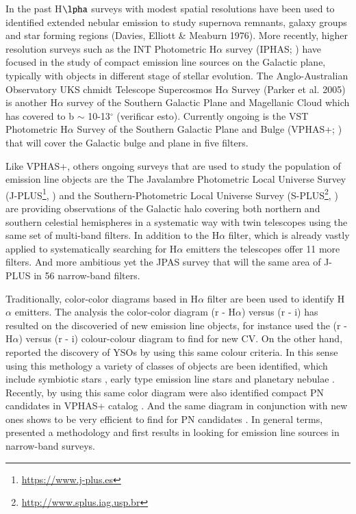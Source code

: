 \documentclass[fleqn,usenatbib]{mnras}
\begin{document}
In the past H$\lpha$ surveys with modest spatial resolutions have been used
to identified extended nebular emission to study supernova remnants, galaxy
groups and star forming regions (Davies, Elliott & Meaburn 1976). More recently,
higher resolution surveys such as the INT Photometric H$\alpha$ survey
(IPHAS; \citealt{Drew:2005, Barentsen:2014}) have focused in the study of
compact emission line sources on the Galactic plane, typically with objects
in different stage of stellar evolution. The Anglo-Australian Observatory UKS
chmidt Telescope Supercosmos H$\alpha$ Survey (Parker et al. 2005) is another
H{$\alpha$} survey of the Southern Galactic Plane and Magellanic Cloud which
has covered to b $\sim$ 10-13$^{\circ}$ (verificar esto). Currently ongoing is
the VST Photometric H$\alpha$ Survey of the Southern Galactic Plane and Bulge
(VPHAS+; \citealt{Drew:2014}) that will cover the Galactic bulge and plane in
five filters. 

Like VPHAS+, others ongoing surveys that are used to study the population of
emission line objects are the The Javalambre Photometric Local Universe Survey
(J-PLUS\footnote{\url{https://www.j-plus.es}}, \citealp{Cenarro:2018})
and the Southern-Photometric Local Universe Survey
(S-PLUS\footnote{\url{http://www.splus.iag.usp.br}}, \citealp{Mendes:2019})
are providing observations of the Galactic halo covering both northern and
southern celestial hemispheres in a systematic way with twin telescopes
using the same set of multi-band filters. In addition to the H$\alpha$ filter,
which is already vastly applied to systematically searching for H$\alpha$ emitters
the telescopes offer 11 more filters. And more ambitious yet the JPAS survey that
will the same area of J-PLUS in 56 narrow-band filters.

Traditionally, color-color diagrams based in H$\alpha$ filter are been used to
identify H$\alpha$ emitters.  The analysis the color-color diagram  (r - H$\alpha$)
versus (r - i) has resulted on the discoveried of new emission line objects, for
instance \citet{Witham:2006, Witham:2007}  used the (r - H$\alpha$) versus (r - i)
colour-colour diagram to find for new CV. On the other hand, \citet{Vink:2008} reported
the discovery of YSOs by using this same colour criteria. In this sense using
this methology a variety of classes of objects are been identified, which include
symbiotic stars \citep{Corradi:2008, Corradi:2010, Corradi:2011}, early type emission
line stars \citep{Drew:2008} and planetary nebulae \citep{Viirone:2009, Sabin:2010}.
Recently, by using this same color diagram were also identified compact PN candidates
in VPHAS+ catalog \citep{Akras:2019}. And the same diagram in conjunction with new
ones shows to be very efficient to find for PN candidates \citep{Gutierrez:2020}.
In general terms, \citet{Witham:2006} presented a methodology and first results
in looking for emission line sources in narrow-band surveys.     
\end{document}

